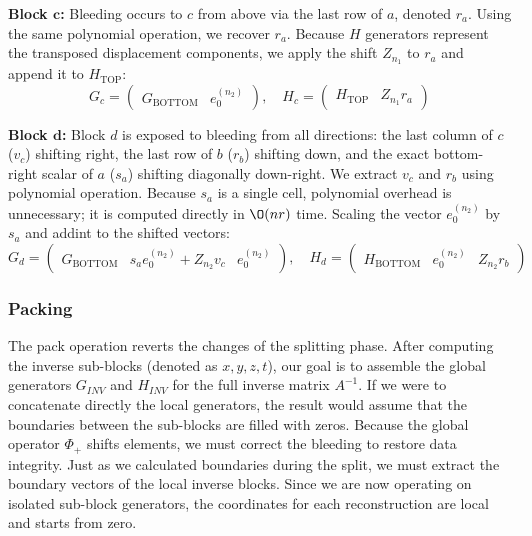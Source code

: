 \vspace{0.5em}
\noindent\textbf{Block $\boldsymbol{c}$:}
Bleeding occurs to $c$ from above via the last row of $a$, denoted
$r_a$. Using the same polynomial operation, we recover $r_a$.
Because $H$ generators represent the transposed displacement
components, we apply the shift $Z_{n_1}$ to $r_a$ and append it to
$H_{\text{TOP}}$:
$$ G_{c} =
\begin{pmatrix} G_{\text{BOTTOM}} & e_0^{(n_2)}
\end{pmatrix}, \quad H_{c} =
\begin{pmatrix} H_{\text{TOP}} & Z_{n_1} r_a
\end{pmatrix} $$

\vspace{0.5em}
\noindent\textbf{Block $\boldsymbol{d}$:}
Block $d$ is exposed to bleeding from all directions: the last column
of $c$ ($v_c$) shifting right, the last row of $b$ ($r_b$) shifting down,
and the exact bottom-right scalar of $a$ ($s_a$) shifting diagonally down-right.
We extract $v_c$ and $r_b$ using polynomial operation.
Because $s_a$ is a single cell, polynomial overhead is unnecessary;
it is computed directly in $\O(n r)$ time.
Scaling the vector $e_0^{(n_2)}$ by $s_a$ and addint to the shifted vectors:
$$ G_{d} =
\begin{pmatrix} G_{\text{BOTTOM}} & s_a e_0^{(n_2)} + Z_{n_2} v_c & e_0^{(n_2)}
\end{pmatrix}, \quad H_{d} =
\begin{pmatrix} H_{\text{BOTTOM}} & e_0^{(n_2)} & Z_{n_2} r_b
\end{pmatrix} $$

\vspace{1em}
\subsubsection{Packing}

The pack operation reverts the changes of the splitting phase.
After computing the inverse sub-blocks (denoted as $x, y, z, t$),
our goal is to assemble the global generators $G_{INV}$ and $H_{INV}$
for the full inverse matrix $A^{-1}$.
If we were to concatenate directly the local generators,
the result would assume that the boundaries between the sub-blocks
are filled with zeros.
Because the global operator $\Phi_+$ shifts elements,
we must correct the bleeding to restore data integrity.
Just as we calculated boundaries during the split, we must extract
the boundary vectors of the local inverse blocks.
Since we are now operating on isolated sub-block generators, the
coordinates for each reconstruction are local and starts from zero.

